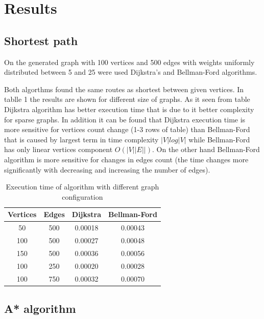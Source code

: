\section*{Results}

\subsection*{Shortest path}

On the generated graph with 100 vertices and 500 edges with weights uniformly distributed between 5 and 25 were used Dijkstra's and Bellman-Ford algorithms.

Both algorthms found the same routes as shortest between given vertices. In tablle 1 the results are shown for different size of graphs. 
As it seen from table Dijkstra algorithm has better execution time that is due to it better complexity for sparse graphs. In addition it can be found that
Dijkstra execution time is more sensitive for vertices count change (1-3 rows of table) than Bellman-Ford that is caused by largest term in time complexity $|V|log|V|$ while Bellman-Ford has only linear vertices component $O(|V||E||)$. 
On the other hand Bellman-Ford algorithm is more sensitive for changes in edges count (the time changes more significantly with decreasing and increasing the number of edges).

\begin{table}[h!]
    \begin{center}
        \begin{tabular}[center]{|c|c|c|c|}
            \hline
            Vertices & Edges & Dijkstra & Bellman-Ford\\
            \hline
            50 & 500 &  0.00018 & 0.00043 \\ \hline
            100 & 500 & 0.00027 & 0.00048 \\ \hline
            150 & 500 & 0.00036 & 0.00056\\ \hline
            100 & 250 & 0.00020 & 0.00028 \\ \hline
            100 & 750 & 0.00032 & 0.00070 \\ \hline         
        \end{tabular}
        \caption{Execution time of algorithm with different graph configuration}    
    \end{center}
\end{table}

\subsection*{A* algorithm}

